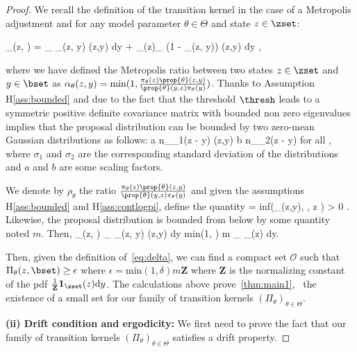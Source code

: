 \documentclass{article} %
\begin{document}
\begin{proof}
We recall the definition of the transition kernel in the case of a Metropolis adjustment and for any model parameter $\theta \in \Theta$ and state $z \in \zset$:

\beq 
\Pi_\theta(z, \bset) = \int_{\bset} \alpha_\theta(z, y) \prop{\theta}(z,y) \textrm{d}y + _{\bset(z)}\int_{\zset} (1 - \alpha_\theta(z, y)) \prop{\theta}(z,y) \textrm{d}y \eqsp,
\eeq

where we have defined the Metropolis ratio between two states $z \in \zset$ and $y \in \bset$ as $\alpha_\theta(z, y) = \textrm{min}(1, \frac{\pi_\theta(z)  \prop{\theta}(z,y)}{\prop{\theta}(y,z) \pi_\theta(y)  })$.
Thanks to Assumption H\ref{ass:bounded} and due to the fact that the threshold $\thresh$ leads to a symmetric positive definite covariance matrix with bounded non zero eigenvalues implies that the proposal distribution can be bounded by two zero-mean Gaussian distributions as follows:
\beq\label{eq:twogauss}
a n_{\sigma_1}(z - y) \leq \prop{\theta}(z,y)  \leq b n_{\sigma_2}(z - y) \quad \textrm{for all} \quad \theta \in \Theta\eqsp,
\eeq
where $\sigma_1$ and $\sigma_2$ are the corresponding standard deviation of the distributions and $a$ and $b$ are some scaling factors.

We denote by $\rho_\theta$ the ratio $\frac{\pi_\theta(z)  \prop{\theta}(z,y)}{\prop{\theta}(y,z) \pi_\theta(y)  }$ and given the assumptions H\ref{ass:bounded} and H\ref{ass:contlogpi}, define the quantity 
\beq\label{eq:delta}
\delta = \textrm{inf}(\rho_\theta(z,y), \theta \in \Theta, \quad z \in {} ) > 0 \eqsp.
\eeq
Likewise, the proposal distribution is bounded from below by some quantity noted $m$.
Then,
\beq
\Pi_\theta(z, \bset) \geq  \int_{\bset \cap \xset} \alpha_\theta(z, y) \prop{\theta}(z,y) \textrm{d}y \geq \textrm{min}(1, \delta) m \int_{\bset} _\xset(z)  \textrm{d}y\eqsp.
\eeq

Then, given the definition of~\eqref{eq:delta}, we can find a compact set $\mathcal{O}$ such that $\Pi_\theta(z, \bset) \geq  \epsilon$ where $\epsilon = \textrm{min}(1, \delta) m \textbf{Z}$ where $\textbf{Z}$ is the normalizing constant of the pdf $\frac{1}{\textbf{Z}}\mathbf{1}_\xset(z)  \textrm{d}y$.
The calculations above prove~\eqref{thm:main1}, \ie\ the existence of a small set for our family of transition kernels $(\Pi_\theta)_{\theta \in \Theta}$.

\medskip
\noindent \textbf{(ii) Drift condition and ergodicity: }
We first need to prove the fact that our family of transition kernels $(\Pi_\theta)_{\theta \in \Theta}$ satisfies a drift property.


\end{proof}
\end{document}
